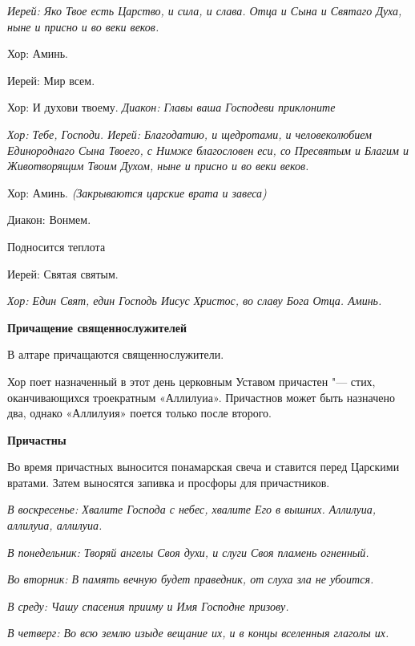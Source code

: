 \itshape  Иерей:\normalfont{} Яко Твое есть Царство, и сила, и слава. Отца и Сына и Святаго Духа, ныне и присно и во веки веков. \itshape 


  Хор:\normalfont{} Аминь. \itshape 


  Иерей:\normalfont{} Мир всем. \itshape 


  Хор:\normalfont{} И духови твоему. \itshape  Диакон:\normalfont{} Главы ваша Господеви приклоните


\itshape Хор:\normalfont{} Тебе, Господи. \itshape  Иерей:\normalfont{} Благодатию, и щедротами, и человеколюбием Единороднаго Сына Твоего, с Нимже благословен еси, со Пресвятым и Благим и Животворящим Твоим Духом, ныне и присно и во веки веков. \itshape 


  Хор:\normalfont{} Аминь. \itshape  (Закрываются царские врата и завеса)


  Диакон:\normalfont{} Вонмем. \itshape 


  Подносится теплот\normalfont{}а \itshape 


  Иерей:\normalfont{} Святая святым. 


\itshape  Хор:\normalfont{} Един Свят, един Господь Иисус Христос, во славу Бога Отца. Аминь. 


\medskip\bfseries  Причащение священнослужителей \normalfont{}\nopagebreak


  В алтаре причащаются священнослужители. 


Хор поет назначенный в этот день церковным Уставом причастен "--- стих, оканчивающихся троекратным «Аллилуиа». Причастнов может быть назначено два, однако «Аллилуия» поется только после второго. 


\medskip\bfseries  Причастны \normalfont{}\nopagebreak


      Во время причастных выносится понамарская свеча и ставится перед Царскими вратами. Затем выносятся запивка и просфоры для причастников.


\itshape  В воскресенье:\normalfont{} Хвалите Господа с небес, хвалите Его в вышних. Аллилуиа, аллилуиа, аллилуиа. 


\itshape В понедельник:\normalfont{} Творяй ангелы Своя духи, и слуги Своя пламень огненный. 


\itshape Во вторник:\normalfont{} В память вечную будет праведник, от слуха зла не убоится. 


\itshape В среду:\normalfont{} Чашу спасения прииму и Имя Господне призову. 


\itshape В четверг:\normalfont{} Во всю землю изыде вещание их, и в концы вселенныя глаголы их. \itshape 


